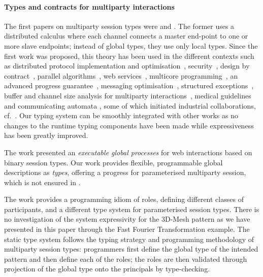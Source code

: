 \documentclass{LMCS}
\begin{document}
\paragraph*{\bf Types and contracts for multiparty interactions}
The first papers on multiparty session types were \cite{BC07} and
\cite{CHY07}. The former uses a distributed calculus where
each channel connects a master end-point to one or more slave
endpoints; instead of global types, they use only
local types.
Since the first
work \cite{CHY07} was proposed, this theory has been used in the
different contexts such as distributed protocol implementation and
optimisation~\cite{SivaramakrishnanNZE10},
security~\cite{CorinDFBL09,ccdr10},
design by contract~\cite{BHTY10},
parallel algorithms~\cite{NYPHK11,NYH12}, web services~\cite{YDBH10},
multicore programming~\cite{YoshidaVPH08},
an advanced progress guarantee~\cite{BettiniCDLDY08LONG},
messaging optimisation~\cite{esop09},
structured exceptions~\cite{CGY10},
buffer and channel size analysis for multiparty
interactions~\cite{Bufferfull},
medical guidelines~\cite{NYH09} and
communicating automata \cite{DY12},
some of which initiated industrial collaborations, cf.~\cite{HondaMBCY11}.
Our typing system can be smoothly integrated
with other works as no changes to the runtime typing components have been made
while expressiveness has been greatly improved.


The work \cite{carbone.honda.yoshida:esop07}
presented an {\emph{executable global processes}}
for web interactions
based on binary session types.
Our work provides flexible, programmable  global descriptions
as {\em types}, offering a progress for parameterised multiparty
session, which is not ensured in \cite{carbone.honda.yoshida:esop07}.


The work \cite{B10} provides a programming idiom of roles, defining
different classes of participants, and a different type system for
parameterised session types. There is no investigation of the system
expressivity for the 3D-Mesh pattern as we have presented in this
paper through the Fast Fourier Transformation example.  The static
type system follows the typing strategy and programming methodology of
multiparty session types: programmers first define the global type of
the intended pattern and then define each of the roles; the roles are then
validated through projection of the global type onto the principals by
type-checking.
\end{document}
